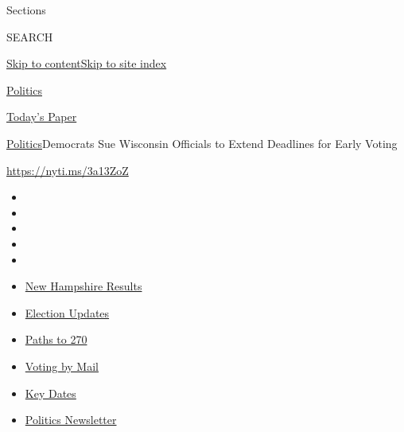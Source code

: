 Sections

SEARCH

\protect\hyperlink{site-content}{Skip to
content}\protect\hyperlink{site-index}{Skip to site index}

\href{https://www.nytimes3xbfgragh.onion/section/politics}{Politics}

\href{https://myaccount.nytimes3xbfgragh.onion/auth/login?response_type=cookie\&client_id=vi}{}

\href{https://www.nytimes3xbfgragh.onion/section/todayspaper}{Today's
Paper}

\href{/section/politics}{Politics}\textbar{}Democrats Sue Wisconsin
Officials to Extend Deadlines for Early Voting

\url{https://nyti.ms/3a13ZoZ}

\begin{itemize}
\item
\item
\item
\item
\item
\end{itemize}

\begin{itemize}
\item
  \href{https://www.nytimes3xbfgragh.onion/interactive/2020/09/08/us/elections/results-new-hampshire-primary-elections.html?action=click\&pgtype=Article\&state=default\&region=TOP_BANNER\&context=storylines_menu}{New
  Hampshire Results}
\item
  \href{https://www.nytimes3xbfgragh.onion/live/2020/09/08/us/trump-vs-biden?action=click\&pgtype=Article\&state=default\&region=TOP_BANNER\&context=storylines_menu}{Election
  Updates}
\item
  \href{https://www.nytimes3xbfgragh.onion/interactive/2020/us/elections/election-states-biden-trump.html?action=click\&pgtype=Article\&state=default\&region=TOP_BANNER\&context=storylines_menu}{Paths
  to 270}
\item
  \href{https://www.nytimes3xbfgragh.onion/interactive/2020/08/31/us/politics/vote-by-mail-deadlines.html?action=click\&pgtype=Article\&state=default\&region=TOP_BANNER\&context=storylines_menu}{Voting
  by Mail}
\item
  \href{https://www.nytimes3xbfgragh.onion/interactive/2019/us/elections/2020-presidential-election-calendar.html?action=click\&pgtype=Article\&state=default\&region=TOP_BANNER\&context=storylines_menu}{Key
  Dates}
\item
  \href{https://www.nytimes3xbfgragh.onion/newsletters/politics?action=click\&pgtype=Article\&state=default\&region=TOP_BANNER\&context=storylines_menu}{Politics
  Newsletter}
\end{itemize}


